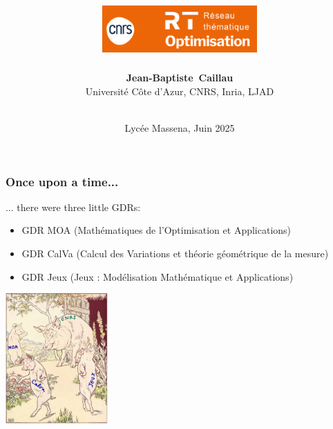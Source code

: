 \documentclass[9pt]{beamer}
\title{%
\includegraphics[height=1.8cm]{logo-rt-opti}}
\author{\textbf{Jean-Baptiste~Caillau}\\
Universit\'e C\^ote d'Azur, CNRS, Inria, LJAD}
\date{\textbf{\emphc{De la géométrie à la pelle (et réciproquement)}}\\ Lycée Massena, Juin 2025}
\begin{document}

\begin{frame}
\frametitle{\bf Once upon a time...}
 
... there were three little GDRs:
\begin{itemize}
  \item GDR MOA (Math\'ematiques de l'Optimisation et Applications)
  \item GDR CalVa (Calcul des Variations et th\'eorie g\'eom\'etrique de la mesure)
  \item GDR Jeux (Jeux : Mod\'elisation Math\'ematique et Applications) 
\end{itemize}
 
\centering \includegraphics[height=5.0cm]{3-pigs}

\end{frame}
\end{document}
